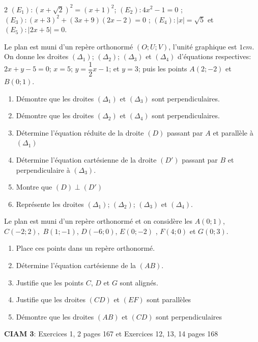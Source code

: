 \begin{multicols*}{2}
  	$(E_{1}): \left(x+\sqrt{2}\right)^2=\left(x+1\right)^2 $; $(E_{2}): 4x^2-1=0$ ; $(E_{3}): \left(x+3\right)^2+(3x+9)(2x-2)=0$ ; $(E_{4}): \left|x\right |=\sqrt{5} $ et  $(E_{5}): \left|2x+5\right |=0 $.
  	
  	\begin{center}
  	\end{center}
  	Le plan est muni d'un repère orthonormé $\left(O; U;V\right)$, l'unité graphique est $1 cm$. On donne les droites $({\Delta}_{1})$; $({\Delta}_{2})$; $({\Delta}_{3})$ et $({\Delta}_{4})$ d'équations respectives: $2x+y-5=0$; $x=5$; $y=\dfrac{1}{2}x-1$; et $y=3$; puis les points $A(2;-2)$ et  $B(0;1)$. 
  	\begin{enumerate}
  		\item Démontre que les droites $({\Delta}_{1})$ et $({\Delta}_{3})$ sont perpendiculaires. 
  		\item Démontre que les droites $({\Delta}_{2})$ et $({\Delta}_{4})$ sont perpendiculaires.
  		\item Détermine l'équation réduite de la droite $ (D) $ passant par $A$ et parallèle à $({\Delta}_{1})$ 
  		\item Détermine l'équation cartésienne de la droite $ (D') $ passant par $B$ et perpendiculaire à $({\Delta}_{3})$.
  		\item Montre que $ (D)\perp (D') $
  		\item  Représente les droites $({\Delta}_{1})$; $({\Delta}_{2})$; $({\Delta}_{3})$ et $({\Delta}_{4})$.
  	\end{enumerate}
  	\begin{center}
  	\end{center}
  	Le plan est muni d'un repère orthonormé et on considère les
  	$A(0;1)$, $ C(-2;2), $  $B(1;-1)$, $ D(-6;0) $, $ E(0;-2) $ , $ F(4;0) $  et $ G(0;3) $.
  	\begin{enumerate}
  		\item Place ces points dans un repère orthonormé.
  		\item Détermine l'équation cartésienne de la $ (AB) $.
  		\item Justifie que les points $ C $, $ D $ et $ G $ sont alignés.
  		\item Justifie que les droites $ (CD) $ et $ (EF) $ sont parallèles
  		\item Démontre que les droites $ (AB) $ et $ (CD) $ sont perpendiculaires 
  	\end{enumerate}
  	\begin{center}
  	\end{center}
  	\textbf{CIAM 3}: Exercices 1, 2 pages 167 et Exercices 12, 13, 14 pages 168  
  \setcounter{q}{0}
  	

\end{multicols*}
